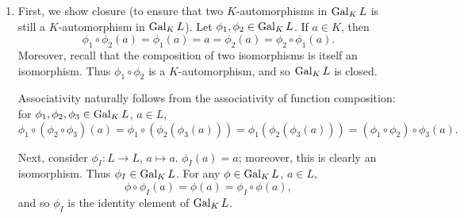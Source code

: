 \documentclass{homework}
\begin{document}
\begin{solution}
  \begin{enumerate}[label=(\alph*)]
    \item First, we show closure (to ensure that two $K$-automorphisms in $\operatorname{Gal}_KL$ is still a
      $K$-automorphism in $\operatorname{Gal}_KL$). Let $\phi_1,\phi_2\in \operatorname{Gal}_KL$. If $a\in K$, then \[
        \phi_1\circ \phi_2(a)=\phi_1(a)=a=\phi_2(a)=\phi_2\circ \phi_1(a)
      .\] Moreover, recall that the composition of two isomorphisms is itself an isomorphism. Thus
      $\phi_1\circ \phi_2$ is a $K$-automorphism, and so $\operatorname{Gal}_KL$ is closed.

      Associativity naturally follows from the associativity of function composition: for
      $\phi_1,\phi_2,\phi_3\in \operatorname{Gal}_KL$, $a\in L$, \[
        \phi_1\circ (\phi_2\circ \phi_3)(a)=\phi_1\circ
        (\phi_2(\phi_3(a)))=\phi_1(\phi_2(\phi_3(a)))=(\phi_1\circ \phi_2)\circ \phi_3(a)
      .\] 

      Next, consider $\phi_I:L\to L$, $a\mapsto a$. $\phi_I(a)=a$; moreover, this is clearly an
      isomorphism. Thus $\phi_I\in \operatorname{Gal}_KL$. For any $\phi\in \operatorname{Gal}_KL$, $a\in L$, \[
        \phi\circ \phi_I(a)=\phi(a)=\phi_I\circ \phi(a)
      ,\] and so $\phi_I$ is the identity element of $\operatorname{Gal}_KL$.


\end{enumerate}
\end{solution}
\end{document}
